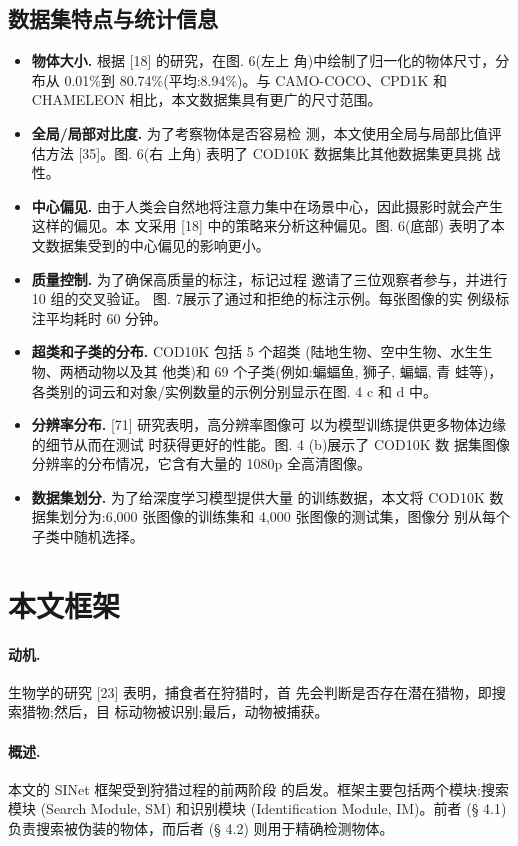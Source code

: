 \documentclass[final]{cvpr}
\newcommand{\mypara}[1]{\paragraph{#1.}}
\begin{document}
\subsection{数据集特点与统计信息}
\begin{itemize}
    \item \textbf{物体大小. }根据 [18] 的研究，在图. 6(左上 角)中绘制了归一化的物体尺寸，分布从 0.01\%到 80.74\%(平均:8.94\%)。与 CAMO-COCO、CPD1K 和 CHAMELEON 相比，本文数据集具有更广的尺寸范围。
    \item \textbf{全局/局部对比度.} 为了考察物体是否容易检 测，本文使用全局与局部比值评估方法 [35]。图. 6(右 上角) 表明了 COD10K 数据集比其他数据集更具挑 战性。
    \item \textbf{中心偏见.} 由于人类会自然地将注意力集中在场景中心，因此摄影时就会产生这样的偏见。本 文采用 [18] 中的策略来分析这种偏见。图. 6(底部) 表明了本文数据集受到的中心偏见的影响更小。
    \item \textbf{质量控制. }为了确保高质量的标注，标记过程 邀请了三位观察者参与，并进行 10 组的交叉验证。 图. 7展示了通过和拒绝的标注示例。每张图像的实 例级标注平均耗时 60 分钟。
    \item \textbf{超类和子类的分布. }COD10K 包括 5 个超类 (陆地生物、空中生物、水生生物、两栖动物以及其 他类)和 69 个子类(例如:蝙蝠鱼, 狮子, 蝙蝠, 青 蛙等)，各类别的词云和对象/实例数量的示例分别显示在图. 4 c 和 d 中。
    \item \textbf{分辨率分布. }[71] 研究表明，高分辨率图像可
以为模型训练提供更多物体边缘的细节从而在测试 时获得更好的性能。图. 4 (b)展示了 COD10K 数 据集图像分辨率的分布情况，它含有大量的 1080p 全高清图像。
    \item \textbf{数据集划分. }为了给深度学习模型提供大量 的训练数据，本文将 COD10K 数据集划分为:6,000 张图像的训练集和 4,000 张图像的测试集，图像分 别从每个子类中随机选择。
\end{itemize}

\section{本文框架}
\mypara{动机}生物学的研究 [23] 表明，捕食者在狩猎时，首 先会判断是否存在潜在猎物，即搜索猎物;然后，目 标动物被识别;最后，动物被捕获。
\mypara{概述}本文的 SINet 框架受到狩猎过程的前两阶段 的启发。框架主要包括两个模块:搜索模块 (Search Module, SM) 和识别模块 (Identification Module, IM)。前者 (§ 4.1) 负责搜索被伪装的物体，而后者 (§ 4.2) 则用于精确检测物体。
\end{document}
